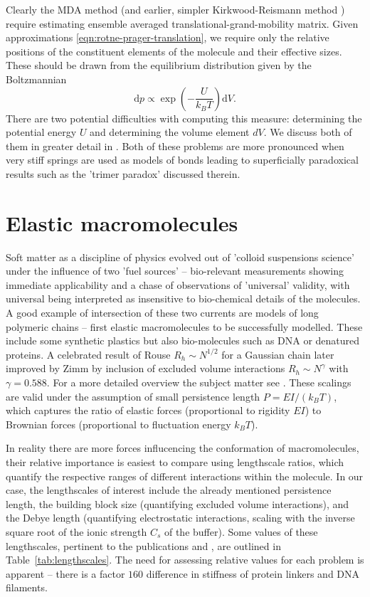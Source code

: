 \documentclass{doctoral}
\newcommand{\dd}{\mathrm{d}}
\begin{document}
Clearly the MDA method (and earlier, simpler Kirkwood-Reismann method \cite{Kirkwood_1948}) require estimating ensemble averaged translational-grand-mobility matrix.
Given approximations \eqref{eqn:rotne-prager-translation}, we require only the relative positions of the constituent elements of the molecule and their effective sizes.
These should be drawn from the equilibrium distribution given by the Boltzmannian
\begin{equation}
    \dd p \propto \exp \left(- \frac{U}{k_B T} \right) \dd V.
\end{equation}
There are two potential difficulties with computing this measure: determining the potential energy $U$ and determining the volume element $dV$.
We discuss both of them in greater detail in \textcite{Waszkiewicz_2024_trimer}.
Both of these problems are more pronounced when very stiff springs are used as models of bonds leading to superficially paradoxical results such as the 'trimer paradox' discussed therein.

\section{Elastic macromolecules}

Soft matter as a discipline of physics evolved out of 'colloid suspensions science' under the influence of two 'fuel sources' -- bio-relevant measurements showing immediate applicability and a chase of observations of 'universal' validity, with universal being interpreted as insensitive to bio-chemical details of the molecules.
A good example of intersection of these two currents are models of long polymeric chains -- first elastic macromolecules to be successfully modelled.
These include some synthetic plastics but also bio-molecules such as DNA or denatured proteins.
A celebrated result of Rouse $R_h \sim N^{1/2}$ for a Gaussian chain \cite{Rouse_1953} later improved by Zimm by inclusion of excluded volume interactions \cite{Zimm_1956} $R_h \sim N^\gamma$ with $\gamma=0.588$.
For a more detailed overview the subject matter see \textcite[chapter 3]{Dhont_2008}.
These scalings are valid under the assumption of small persistence length $P = EI / (k_B T)$, which captures the ratio of elastic forces (proportional to rigidity $EI$) to Brownian forces (proportional to fluctuation energy $k_B T$).

In reality there are more forces influcencing the conformation of macromolecules, their relative importance is easiest to compare using lengthscale ratios, which quantify the respective ranges of different interactions within the molecule.
In our case, the lengthscales of interest include the already mentioned persistence length, the building block size (quantifying excluded volume interactions), and the Debye length (quantifying electrostatic interactions, scaling with the inverse square root of the ionic strength $C_s$ of the buffer).
Some values of these lengthscales, pertinent to the publications \cite{Waszkiewicz_2023_dna} and \cite{Waszkiewicz_2024_mda}, are outlined in Table~\ref{tab:lengthscales}.
The need for assessing relative values for each problem is apparent -- there is a factor $160$ difference in stiffness of protein linkers and DNA filaments.
\end{document}
